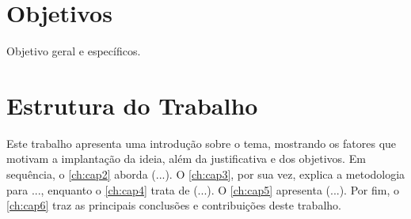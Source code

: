 \section{Objetivos}
Objetivo geral e específicos.

\section{Estrutura do Trabalho}
Este trabalho apresenta uma introdução sobre o tema, mostrando os fatores que motivam a implantação da ideia, além da justificativa e dos objetivos. Em sequência, o \autoref{ch:cap2} aborda (...). O \autoref{ch:cap3}, por sua vez, explica a metodologia para ..., enquanto o \autoref{ch:cap4} trata de (...). O \autoref{ch:cap5} apresenta (...). Por fim, o \autoref{ch:cap6} traz as principais conclusões e contribuições deste trabalho.